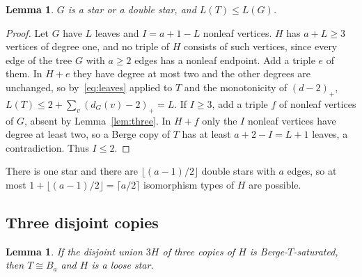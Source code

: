 \documentclass[11pt]{article}
\newtheorem{lemma}[theorem]{Lemma}
\theoremstyle{definition}
\theoremstyle{remark}
\begin{document}
\begin{lemma}\label{lem:expansion}
$G$ is a star or a double star, and $L(T)\le L(G)$.
\end{lemma}

\begin{proof}
Let $G$ have $L$ leaves and $I=a+1-L$ nonleaf vertices. $H$ has $a+L\ge3$
vertices of degree one, and no triple of $H$ consists of such vertices,
since every edge of the tree $G$ with $a\ge2$ edges has a nonleaf endpoint. Add
a triple $e$ of them. In $H+e$ they have degree at most two and the other
degrees are unchanged, so by~\eqref{eq:leaves} applied to $T$ and the
monotonicity of $(d-2)_+$, $L(T)\le2+\sum_v(d_G(v)-2)_+=L$. If $I\ge3$, add
a triple $f$ of nonleaf vertices of $G$, absent by Lemma~\ref{lem:three}.
In $H+f$ only the $I$ nonleaf vertices have degree at least two, so a
Berge copy of $T$ has at least $a+2-I=L+1$ leaves, a contradiction. Thus
$I\le2$.
\end{proof}

There is one star and there are $\lfloor(a-1)/2\rfloor$ double stars with
$a$ edges, so at most $1+\lfloor(a-1)/2\rfloor=\lceil a/2\rceil$
isomorphism types of $H$ are possible.

\subsection{Three disjoint copies}

\begin{lemma}\label{lem:threecopies}
If the disjoint union $3H$ of three copies of $H$ is Berge-$T$-saturated,
then $T\cong B_a$ and $H$ is a loose star.
\end{lemma}
\end{document}
